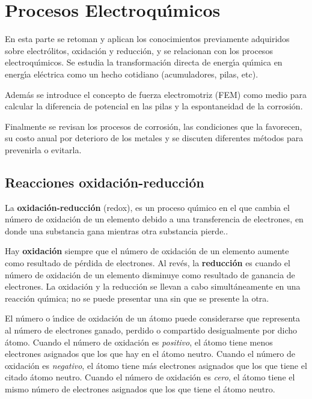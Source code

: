 \section{Procesos Electroqu\'{\i}micos}
En esta parte se retoman y aplican los conocimientos previamente adquiridos sobre
electr\'olitos, oxidaci\'on y reducci\'on, y  se relacionan con los procesos electroqu\'{\i}micos.
Se  estudia la transformaci\'on directa de energ\'{\i}a qu\'{\i}mica en energ\'{\i}a
el\'ectrica como un hecho cotidiano (acumuladores, pilas, etc).

Adem\'as se introduce el concepto de fuerza electromotriz (FEM) como medio para calcular la diferencia de potencial en las pilas y la espontaneidad de la corrosi\'on.

Finalmente se revisan los procesos de corrosi\'on, las condiciones que la favorecen, su
costo anual por deterioro de los metales y se discuten diferentes m\'etodos para prevenirla
o evitarla.
\subsection{Reacciones oxidaci\'on-reducci\'on}
La \textbf{oxidaci\'on-reducci\'on} (redox), es un proceso  qu\'{\i}mico en el que cambia el n\'umero de oxidaci\'on de un elemento debido a una transferencia de electrones, en donde una substancia gana mientras otra substancia pierde..

Hay \textbf{oxidaci\'on} siempre que el n\'umero de  oxidaci\'on de un elemento aumente como resultado de p\'erdida de electrones. Al rev\'es, la \textbf{reducci\'on}  es cuando el n\'umero de oxidaci\'on de un elemento disminuye como resultado de ganancia de electrones. La oxidaci\'on y la reducci\'on se llevan a cabo simult\'aneamente en una reacci\'on qu\'{\i}mica; no se puede presentar una sin que se presente la otra.

El n\'umero o \'{\i}ndice de oxidaci\'on de un \'atomo puede considerarse que representa al n\'umero de electrones ganado, perdido o compartido desigualmente por dicho \'atomo. Cuando el n\'umero de oxidaci\'on es \textit{positivo}, el \'atomo tiene menos electrones asignados que los que hay en el \'atomo neutro. Cuando el n\'umero de oxidaci\'on es \textit{negativo}, el \'atomo tiene m\'as electrones asignados que los que tiene el citado \'atomo neutro. Cuando el n\'umero de oxidaci\'on  es \textit{cero}, el \'atomo tiene el mismo n\'umero de electrones asignados que los que tiene el \'atomo neutro.

